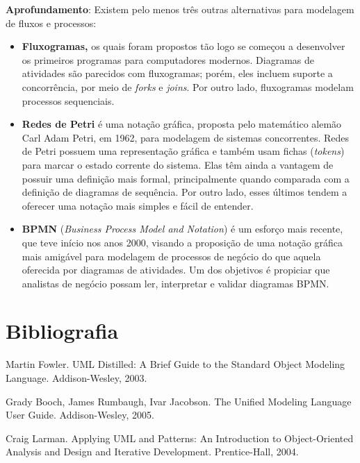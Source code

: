 \documentclass[
  11pt,
  twoside]{book}
\newenvironment{esmbox}{\centering \vspace{1.5ex} \begin{tcolorbox}[breakable, colback=backcolor, width=4.9in]}{\end{tcolorbox} \vspace{1.5ex}}
\begin{document}
\begin{esmbox}

\textbf{Aprofundamento}: Existem pelo menos três outras alternativas
para modelagem de fluxos e processos:

\begin{itemize}
\item
  \textbf{Fluxogramas,}  os quais foram propostos tão
  logo se começou a desenvolver os primeiros programas para computadores
  modernos. Diagramas de atividades são parecidos com fluxogramas;
  porém, eles incluem suporte a concorrência, por meio de \emph{forks} e
  \emph{joins}. Por outro lado, fluxogramas modelam processos
  sequenciais.
\item
  \textbf{Redes de Petri}  é uma notação gráfica,
  proposta pelo matemático alemão Carl Adam Petri, em 1962, para
  modelagem de sistemas concorrentes. Redes de Petri possuem uma
  representação gráfica e também usam fichas (\emph{tokens}) para marcar
  o estado corrente do sistema. Elas têm ainda a vantagem de possuir uma
  definição mais formal, principalmente quando comparada com a definição
  de diagramas de sequência. Por outro lado, esses últimos tendem a
  oferecer uma notação mais simples e fácil de entender.
\item
  \textbf{BPMN} (\emph{Business Process Model and Notation})
   é um esforço mais
  recente, que teve início nos anos 2000, visando a proposição de uma
  notação gráfica mais amigável para modelagem de processos de negócio
  do que aquela oferecida por diagramas de atividades. Um dos objetivos
  é propiciar que analistas de negócio possam ler, interpretar e validar
  diagramas BPMN.
\end{itemize}

\end{esmbox}

\hypertarget{bibliografia-3}{%
\section*{Bibliografia}\label{bibliografia-3}}

Martin Fowler. UML Distilled: A Brief Guide to the Standard Object
Modeling Language. Addison-Wesley, 2003.

Grady Booch, James Rumbaugh, Ivar Jacobson. The Unified Modeling
Language User Guide. Addison-Wesley, 2005.

Craig Larman. Applying UML and Patterns: An Introduction to
Object-Oriented Analysis and Design and Iterative Development.
Prentice-Hall, 2004.
\end{document}
